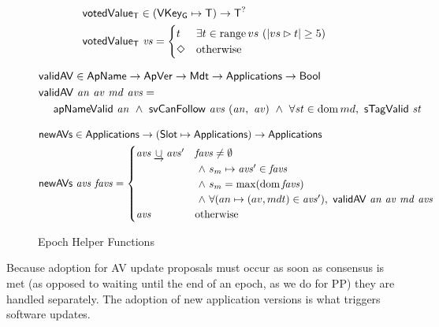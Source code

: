 \begin{figure}[htb]
  \begin{align*}
      & \mathsf{votedValue_T} \in (\mathsf{VKey_G}\mapsto\mathsf{T}) \to \mathsf{T}^?\\
      & \mathsf{votedValue_T}~\mathit{vs} =
        \begin{cases}
          t & \exists t\in\operatorname{range}{vs}~(|vs\rhd t|\geq 5) \\
          \Diamond & \text{otherwise} \\
        \end{cases}
  \end{align*}

  \begin{align*}
      & \mathsf{validAV} \in \mathsf{ApName} \to \mathsf{ApVer} \to \mathsf{Mdt} \to \mathsf{Applications} \to \mathsf{Bool}\\
      & \mathsf{validAV}~\mathit{an}~\mathit{av}~\mathit{md}~\mathit{avs} = \\
      & ~~~~\mathsf{apNameValid}~\mathit{an}
        ~\land~\mathsf{svCanFollow}~\mathit{avs}~(\mathit{an},~\mathit{av})
        ~\land~\forall\mathit{st}\in\operatorname{dom}{md},~\mathsf{sTagValid}~\mathit{st}
  \end{align*}

  \begin{align*}
      & \mathsf{newAVs} \in \mathsf{Applications} \to (\mathsf{Slot}\mapsto\mathsf{Applications}) \to \mathsf{Applications} \\
      & \mathsf{newAVs}~\mathit{avs}~\mathit{favs} =
        \begin{cases}
          \mathit{avs}\mathbin{\underrightarrow\cup}\mathit{avs}'
                     & \mathit{favs}\neq\emptyset \\
                     & ~\land~s_m\mapsto\mathit{avs'}\in\mathit{favs} \\
                     & ~\land~s_m=\max(\operatorname{dom}{\mathit{favs}}) \\
                     & ~\land~\forall(an\mapsto(av, mdt)\in\mathit{avs}'),
                         ~\mathsf{validAV}~\mathit{an}~\mathit{av}~\mathit{md}~\mathit{avs}
          \\
          \mathit{avs} & \text{otherwise}
        \end{cases}
  \end{align*}

  \caption{Epoch Helper Functions}
  \label{fig:funcs:helper-updates}
\end{figure}

Because adoption
for AV update proposals must occur as soon as consensus is met (as opposed to waiting until the
end of an epoch, as we do for PP) they are handled separately.
The adoption of new application versions is what triggers software updates.

